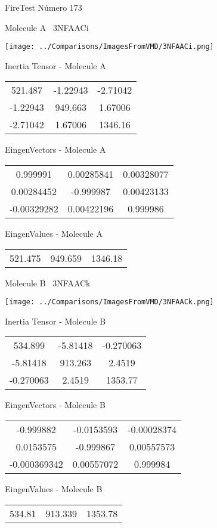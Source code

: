 \vtab[-3cm]
\begin{center}
{\large FireTest \tab Número 173}
\end{center}
\begin{multicols}{2}
\begin{center}

Molecule A \
3NFAACi

\texttt{[image: ../Comparisons/ImagesFromVMD/3NFAACi.png]}

Inertia Tensor - Molecule A \\
\begin{tabular}{|c c c|}
521.487	 & 	-1.22943	 & 	-2.71042	 \\
-1.22943	 & 	949.663	 & 	1.67006	 \\
-2.71042	 & 	1.67006	 & 	1346.16
\end{tabular}

\vtab
 EingenVectors - Molecule A     \\
\begin{tabular}{|c c c|}
0.999991	 & 	0.00285841	 & 	0.00328077	 \\
0.00284452	 & 	-0.999987	 & 	0.00423133	 \\
-0.00329282	 & 	0.00422196	 & 	0.999986
\end{tabular}

\vtab
 EingenValues - Molecule A     \\
\begin{tabular}{|c c c|}
521.475	 & 	949.659	 & 	1346.18	 \\
\end{tabular}
\columnbreak

Molecule B \
3NFAACk

\texttt{[image: ../Comparisons/ImagesFromVMD/3NFAACk.png]}

Inertia Tensor - Molecule B \\
\begin{tabular}{|c c c|}
534.899	 & 	-5.81418	 & 	-0.270063	 \\
-5.81418	 & 	913.263	 & 	2.4519	 \\
-0.270063	 & 	2.4519	 & 	1353.77
\end{tabular}

\vtab
 EingenVectors - Molecule B     \\
\begin{tabular}{|c c c|}
-0.999882	 & 	-0.0153593	 & 	-0.00028374	 \\
0.0153575	 & 	-0.999867	 & 	0.00557573	 \\
-0.000369342	 & 	0.00557072	 & 	0.999984
\end{tabular}

\vtab
 EingenValues - Molecule B     \\
\begin{tabular}{|c c c|}
534.81	 & 	913.339	 & 	1353.78	 \\
\end{tabular}

\end{center}
\end{multicols}

